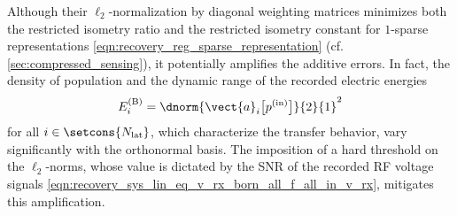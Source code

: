 Although
their $\ell_{2}$-normalization by
diagonal weighting matrices minimizes both
the restricted isometry ratio and
the restricted isometry constant for
$1$-sparse representations
\eqref{eqn:recovery_reg_sparse_representation}
(cf. \cref{sec:compressed_sensing}),
it potentially amplifies
the additive errors.
In fact,
the density of
population and
the dynamic range of
the recorded electric energies
\begin{equation}
  E_{i}^{(\text{B})}
  =
  \dnorm{ \vect{a}_{i}\bigl[ p^{(\text{in})} \bigr] }{2}{1}^{2}
 \label{eqn:recovery_reg_v_rx_born_trans_coef_energy}
\end{equation}
for
all $i \in \setcons{ N_{\text{lat}} }$, which characterize
the transfer behavior, vary significantly with
the orthonormal basis.
The imposition of
a hard threshold on
the $\ell_{2}$-norms, whose value is dictated by
the \ac{SNR} of
the recorded \ac{RF} voltage signals
\eqref{eqn:recovery_sys_lin_eq_v_rx_born_all_f_all_in_v_rx}, mitigates
this amplification.

